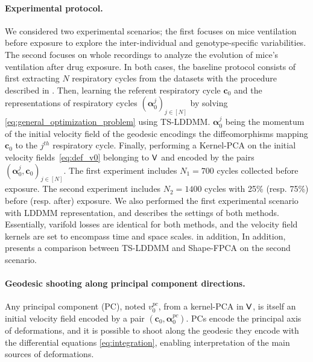 \paragraph{Experimental protocol.} 
We considered two experimental scenarios; the first focuses on mice ventilation before exposure to explore the inter-individual and genotype-specific variabilities. The second focuses on whole recordings to analyze the evolution of mice's ventilation after drug exposure. In both cases, the baseline protocol consists of first extracting $N$ respiratory cycles from the datasets with the procedure described in \cite{germain2023unsupervised}. Then, learning the referent respiratory cycle $\mathbf{c}_0$ and the representations  of respiratory cycles $(\bm{\alpha}_0^j)_{j \in [N]}$ by solving \eqref{eq:general_optimization_problem} using TS-LDDMM. $\bm{\alpha}_0^j$ being the momentum of the initial velocity field of the geodesic encodings the diffeomorphisms mapping $\mathbf{c}_0$ to the $j^{th}$ respiratory cycle. Finally, performing a Kernel-PCA on the initial velocity fields~\eqref{eq:def_v0} belonging to $\mathsf{V}$ and encoded by the pairs $(\bm{\alpha}_0^j,\mathbf{c}_0)_{j \in [N]}$. The first experiment includes $N_1 = 700$ cycles collected before exposure. The second experiment includes $N_2 = 1400$ cycles with 25\% (resp. 75\%) before (resp. after) exposure. We also performed the first experimental scenario with LDDMM representation, and  describes the settings of both methods. Essentially, varifold losses are identical for both methods, and the velocity field kernels are set to encompass time and space scales. in addition, In addition,   presents a comparison between TS-LDDMM and Shape-FPCA on the second scenario. 
\vspace{-1ex}

\paragraph{Geodesic shooting along principal component directions.}
Any principal component (PC), noted $v_0^{pc}$, from a kernel-PCA in $\mathsf{V}$, is itself an initial velocity field encoded by a pair $(\mathbf{c}_0, \bm{\alpha}_0^{pc})$. PCs encode the principal axis of deformations, and it is possible to shoot along the geodesic they encode with the differential equations \eqref{eq:integration}, enabling interpretation of the main sources of deformations.
\vspace{-1ex}

